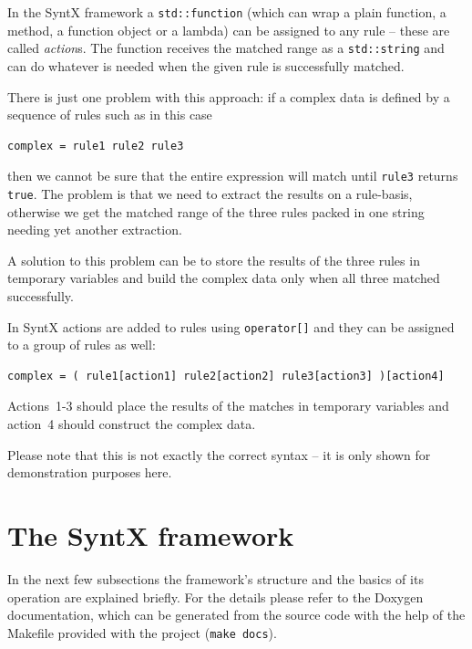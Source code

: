 \documentclass[12pt]{article}
\newcommand{\usec}[2]{\section*{#1}\label{sec:#2}\addcontentsline{toc}{section}{#1}}
\begin{document}
In the SyntX framework a \texttt{std::function} (which can wrap a plain function, a method, a function object
or a lambda) can be assigned to any rule -- these are called \emph{action}s. The function receives the matched
range as a \texttt{std::string} and can do whatever is needed when the given rule is successfully matched.

There is just one problem with this approach: if a complex data is defined by a sequence of rules such as in
this case

\begin{center}
	\begin{minipage}[h]{0.8\textwidth}
		\begin{lstlisting}[breaklines=true]
complex = rule1 rule2 rule3
		\end{lstlisting}
	\end{minipage}
\end{center}

\noindent then we cannot be sure that the entire expression will match until \texttt{rule3} returns
\texttt{true}. The problem is that we need to extract the results on a rule-basis, otherwise we get the
matched range of the three rules packed in one string needing yet another extraction.

A solution to this problem can be to store the results of the three rules in temporary variables and build the
complex data only when all three matched successfully.

In SyntX actions are added to rules using \texttt{operator[]} and they can be assigned to a group of rules as
well:

\begin{center}
	\begin{minipage}[h]{0.8\textwidth}
		\begin{lstlisting}[breaklines=true]
complex = ( rule1[action1] rule2[action2] rule3[action3] )[action4]
		\end{lstlisting}
	\end{minipage}
\end{center}

Actions~1-3 should place the results of the matches in temporary variables and action~4 should construct the
complex data.

Please note that this is not exactly the correct syntax -- it is only shown for demonstration purposes here.

\usec{The SyntX framework}{syntx}
In the next few subsections the framework's structure and the basics of its operation are explained briefly. For
the details please refer to the Doxygen documentation, which can be generated from the source code with the
help of the Makefile provided with the project (\texttt{make docs}).
\end{document}

